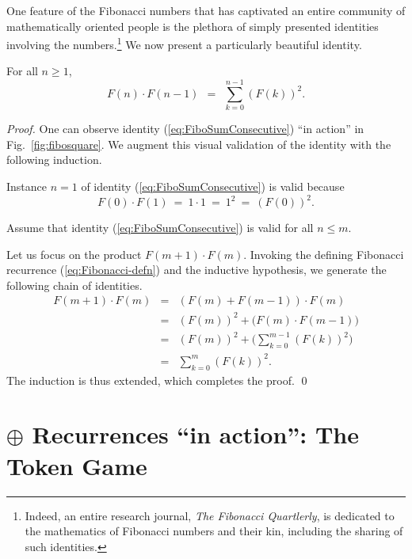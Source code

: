 One feature of the Fibonacci numbers that has captivated an entire
community of mathematically oriented people is the plethora of simply
presented identities involving the numbers.\footnote{Indeed, an entire
  research journal, {\it The Fibonacci Quartlerly}, is dedicated to the mathematics of Fibonacci
  numbers and their kin, including the sharing of such identities.}
We now present a particularly beautiful identity.

\begin{prop} 
\label{thm:FiboSumConsecutive}
For all $n \geq 1$,
\begin{equation}
\label{eq:FiboSumConsecutive}
F(n) \cdot F(n-1) \ \ = \ \ \sum_{k=0}^{n-1} (F(k))^2.
\end{equation}
\end{prop}

\begin{proof}
One can observe identity (\ref{eq:FiboSumConsecutive}) ``in action''
in Fig.~\ref{fig:fibosquare}.  We augment this visual validation of
the identity with the following induction.

\medskip

Instance $n=1$ of identity (\ref{eq:FiboSumConsecutive}) is valid
because
\[ F(0) \cdot F(1) \ = \ 1 \cdot 1 \ = \ 1^2 \ = \ (F(0))^2. \]

\medskip

Assume that identity (\ref{eq:FiboSumConsecutive}) is valid for all $n
\leq m$.

\medskip

  Let us focus on the product
$F(m+1) \cdot F(m)$.  Invoking the defining Fibonacci recurrence
(\ref{eq:Fibonacci-defn}) and the inductive hypothesis, we generate
the following chain of identities.
\begin{eqnarray*}
F(m+1) \cdot F(m)
 & = &
   (F(m) + F(m-1)) \cdot F(m) \\
 & = &
   (F(m))^2 + \big( F(m) \cdot F(m-1) \big) \\
 & = & 
   (F(m))^2 + \big( \sum_{k=0}^{m-1} (F(k))^2 \big) \\
 & = &
   \sum_{k=0}^{m} (F(k))^2.
\end{eqnarray*}
The induction is thus extended, which completes the proof.
\qed
\end{proof}


\section{$\oplus$ Recurrences ``in action'': The Token Game}
\label{sec:TokenGame}

